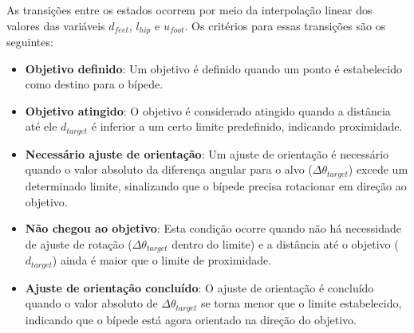 As transições entre os estados ocorrem por meio da interpolação linear dos valores das variáveis $d_{feet}$, $l_{hip}$ e $u_{foot}$. Os critérios para essas transições são os seguintes:
\begin{itemize}
    \item \textbf{Objetivo definido}: Um objetivo é definido quando um ponto é estabelecido como destino para o bípede.
    \item \textbf{Objetivo atingido}: O objetivo é considerado atingido quando a distância até ele $d_{target}$ é inferior a um certo limite predefinido, indicando proximidade.
    \item \textbf{Necessário ajuste de orientação}: Um ajuste de orientação é necessário quando o valor absoluto da diferença angular para o alvo ($\Delta\theta_{target}$) excede um determinado limite, sinalizando que o bípede precisa rotacionar em direção ao objetivo.
    \item \textbf{Não chegou ao objetivo}: Esta condição ocorre quando não há necessidade de ajuste de rotação ($\Delta\theta_{target}$ dentro do limite) e a distância até o objetivo ($d_{target}$) ainda é maior que o limite de proximidade.
    \item \textbf{Ajuste de orientação concluído}: O ajuste de orientação é concluído quando o valor absoluto de $\Delta\theta_{target}$ se torna menor que o limite estabelecido, indicando que o bípede está agora orientado na direção do objetivo.
\end{itemize}
